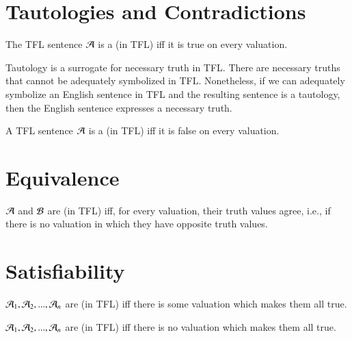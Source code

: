 \section{ Tautologies and Contradictions}

\begin{definition}
    The TFL sentence $\mathcal{A}$ is a  (in TFL) iff it is true on every valuation.
\end{definition}

\begin{remark}
    Tautology is a surrogate for necessary truth in TFL. There are necessary truths that cannot be adequately symbolized in TFL. Nonetheless, if we can adequately symbolize an English sentence in TFL and the resulting sentence is a tautology, then the English sentence expresses a necessary truth.
\end{remark}


\begin{definition}
    A TFL sentence $\mathcal{A}$ is a  (in TFL) iff it is false on every valuation.
\end{definition}

\section{ Equivalence}


\begin{definition}
    $\mathcal{A}$ and $\mathcal{B}$ are  (in TFL) iff, for every valuation, their truth values agree, i.e., if there is no valuation in which they have opposite truth values.
\end{definition}

\section{ Satisfiability}

\begin{definition}
    $\mathcal{A}_1,\mathcal{A}_2,...,\mathcal{A}_n$ are  (in TFL) iff there is some valuation which makes them all true.
\end{definition}


\begin{definition}
    $\mathcal{A}_1,\mathcal{A}_2,...,\mathcal{A}_n$ are  (in TFL) iff there is no valuation which makes them all true. 
\end{definition}

